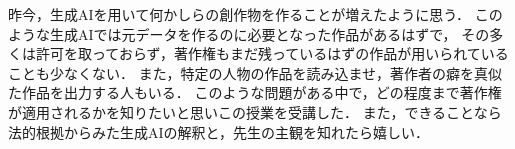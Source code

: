昨今，生成AIを用いて何かしらの創作物を作ることが増えたように思う．
このような生成AIでは元データを作るのに必要となった作品があるはずで，
その多くは許可を取っておらず，著作権もまだ残っているはずの作品が用いられていることも少なくない．
また，特定の人物の作品を読み込ませ，著作者の癖を真似た作品を出力する人もいる．
このような問題がある中で，どの程度まで著作権が適用されるかを知りたいと思いこの授業を受講した．
また，できることなら法的根拠からみた生成AIの解釈と，先生の主観を知れたら嬉しい．